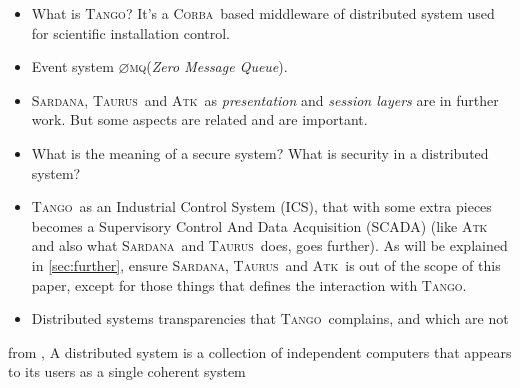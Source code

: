 \documentclass[10pt,a4paper,twoside]{llncs}
\newcommand{\tango}{\textsc{Tango}}
\newcommand{\sardana}{\textsc{Sardana}}
\newcommand{\taurus}{\textsc{Taurus}}
\newcommand{\atk}{\textsc{Atk}}
\newcommand{\zmq}{\textsc{$\varnothing$mq}}
\newcommand{\corba}{\textsc{Corba}}
\begin{document}
\begin{itemize}
 \item What is \tango? It's a \corba\, based middleware of distributed system used for scientific installation control.
 \item Event system \zmq (\emph{Zero Message Queue}).
 \item \sardana, \taurus\, and \atk\, as \emph{presentation} and \emph{session layers} are in further work. But some aspects are related and are important.
 \item What is the meaning of a secure system? What is security in a distributed system?
 \item \tango\, as an Industrial Control System (ICS), that with some extra pieces becomes a Supervisory Control And Data Acquisition (SCADA) (like \atk\, and also what \sardana\, and \taurus\, does, goes further). As will be explained in \ref{sec:further}, ensure \sardana, \taurus\, and \atk\, is out of the scope of this paper, except for those things that defines the interaction with \tango.
 \item Distributed systems transparencies \cite{TanenbaumDistr} that \tango\, complains, and which are not
\end{itemize}
  \begin{definition}
   from \cite{TanenbaumDistr}, A distributed system is a collection of independent computers that appears to its users as a single coherent system
  \end{definition}

  \begin{figure}[h]
  \end{figure}
\end{document}
